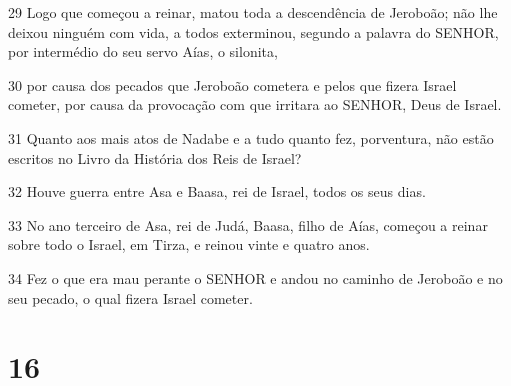 \par 29 Logo que começou a reinar, matou toda a descendência de Jeroboão; não lhe deixou ninguém com vida, a todos exterminou, segundo a palavra do SENHOR, por intermédio do seu servo Aías, o silonita,
\par 30 por causa dos pecados que Jeroboão cometera e pelos que fizera Israel cometer, por causa da provocação com que irritara ao SENHOR, Deus de Israel.
\par 31 Quanto aos mais atos de Nadabe e a tudo quanto fez, porventura, não estão escritos no Livro da História dos Reis de Israel?
\par 32 Houve guerra entre Asa e Baasa, rei de Israel, todos os seus dias.
\par 33 No ano terceiro de Asa, rei de Judá, Baasa, filho de Aías, começou a reinar sobre todo o Israel, em Tirza, e reinou vinte e quatro anos.
\par 34 Fez o que era mau perante o SENHOR e andou no caminho de Jeroboão e no seu pecado, o qual fizera Israel cometer.

\chapter{16}

